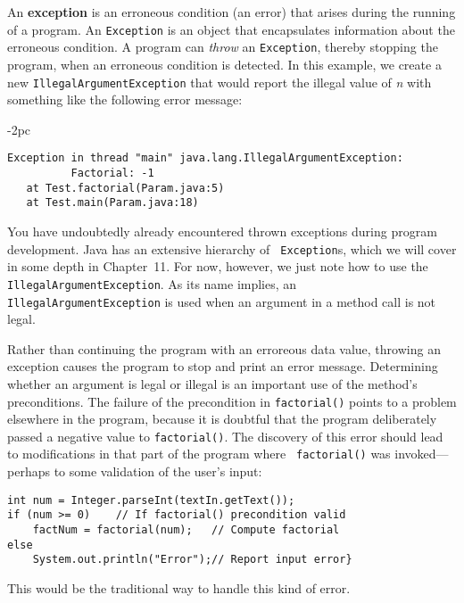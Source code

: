 \noindent An {\bf exception} is an erroneous condition (an error) that
arises during the running of a program. An {\tt Exception} is an
object that encapsulates information about the erroneous condition.  A
program can {\em throw} an {\tt Exception}, thereby stopping the
program, when an erroneous condition is detected. In this example, we
create a new {\tt IllegalArgumentException} that would report the
illegal value of {\em n} with something like the following error
message:

\begin{jjjlistingleft}[28pc]{-2pc}
\begin{lstlisting}
Exception in thread "main" java.lang.IllegalArgumentException: 
          Factorial: -1
   at Test.factorial(Param.java:5)
   at Test.main(Param.java:18)
\end{lstlisting}
\end{jjjlistingleft}

\noindent You have undoubtedly already encountered thrown exceptions
during program development.  Java has an extensive hierarchy of {\tt
Exception}s, which we will cover in some depth in Chapter~11.  For
now, however, we just note how to use the {\tt
IllegalArgumentException}. As its name implies, an {\tt
IllegalArgumentException} is used when an argument in a method call is
not legal.

Rather than continuing the program with an erroreous data value,
throwing an exception causes the program to stop and print an error
message.  Determining whether an argument is legal or illegal is an
important use of the method's preconditions.  The failure of the
precondition in {\tt factorial()} points to a problem elsewhere in the
program, because it is doubtful that the program deliberately passed a
negative value to {\tt factorial()}. The discovery of this error
should lead to modifications in that part of the program where {\tt
factorial()} was invoked---perhaps to some validation of the user's
input:

\begin{jjjlisting}
\begin{lstlisting}
int num = Integer.parseInt(textIn.getText());
if (num >= 0)    // If factorial() precondition valid
    factNum = factorial(num);   // Compute factorial
else
    System.out.println("Error");// Report input error}
\end{lstlisting}
\end{jjjlisting}

\noindent This would be the traditional way to handle this kind
of error. 

